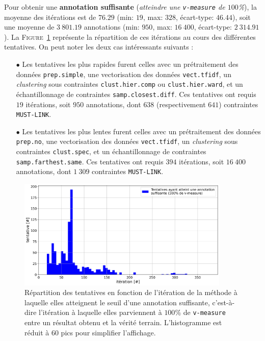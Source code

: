 			Pour obtenir une \textbf{annotation suffisante} (\textit{atteindre une \texttt{v-measure} de $100$\%}), la moyenne des itérations est de $76.29$ (min: $19$, max: $328$, écart-type: $46.44$), soit une moyenne de $3~801.19$ annotations (min: $950$, max: $16~400$, écart-type: $2~314.91$).
			La \textsc{Figure~\ref{figure:4.2.1-ETUDE-OPTIMISATION-HISTOGRAMME-ANNOTATION-SUFFISANTE}} représente la répartition de ces itérations au cours des différentes tentatives.
			On peut noter les deux cas intéressants suivants :
			\begin{itemize}
				\item[$\bullet$] Les tentatives les plus rapides furent celles avec un prétraitement des données \texttt{prep.simple}, une vectorisation des données \texttt{vect.tfidf}, un \textit{clustering} sous contraintes \texttt{clust.hier.comp} ou \texttt{clust.hier.ward}, et un échantillonnage de contraintes \texttt{samp.closest.diff}. Ces tentatives ont requis $19$ itérations, soit $950$ annotations, dont $638$ (respectivement $641$) contraintes \texttt{MUST-LINK}.
				\item[$\bullet$] Les tentatives les plus lentes furent celles avec un prétraitement des données \texttt{prep.no}, une vectorisation des données \texttt{vect.tfidf}, un \textit{clustering} sous contraintes \texttt{clust.spec}, et un échantillonnage de contraintes \texttt{samp.farthest.same}. Ces tentatives ont requis $394$ itérations, soit $16~400$ annotations, dont $1~309$ contraintes \texttt{MUST-LINK}.
			\end{itemize}
			\begin{figure}[!htb]
				\centering
				\includegraphics[width=0.90\textwidth]{figures/etude-efficience-histogramme-annotation-suffisante}
				\caption{
					Répartition des tentatives en fonction de l'itération de la méthode à laquelle elles atteignent le seuil d'une annotation suffisante, c'est-à-dire l'itération à laquelle elles parviennent à $100$\% de \texttt{v-measure} entre un résultat obtenu et la vérité terrain.
					L'histogramme est réduit à $60$ pics pour simplifier l'affichage.
				}
				\label{figure:4.2.1-ETUDE-OPTIMISATION-HISTOGRAMME-ANNOTATION-SUFFISANTE}
			\end{figure}
